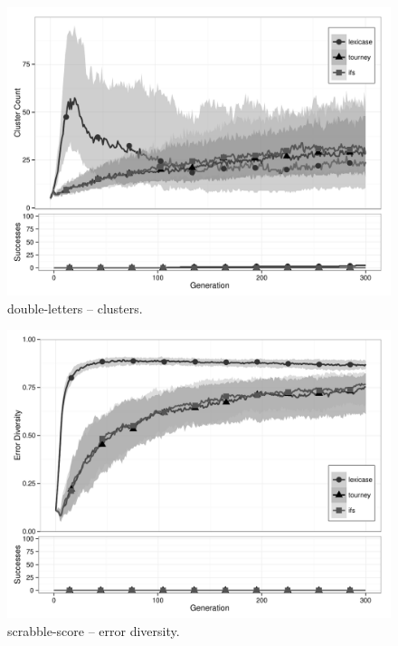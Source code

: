 \begin{figure}[p] %
\centering
\includegraphics[width=11.5cm]{double-letters-cluster.pdf}
\caption{double-letters -- clusters.}
\label{double-lettersClu}
\end{figure}

\begin{figure}[p] %
\centering
\includegraphics[width=11.5cm]{scrabble-score-diversity.pdf}
\caption{scrabble-score -- error diversity.}
\label{scrabble-scoreDiv}
\end{figure}

